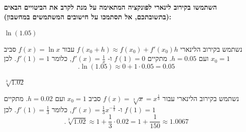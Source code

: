 \textbf{השתמשו בקירוב לינארי לפונקציה המתאימה על מנת לקרב את הביטויים הבאים (בתשובתכם,
אל תסתמכו על חישובים המשתמשים במחשבון):}
\bE{}
\item$\ln(1.05)$
\begin{solbox}
\unverified
נשתמש בקירוב הלינארי
$f(x_0+h)\approx f(x_0)+f'(x_0)h$
עבור
$f(x)=\ln x$
סביב
$x_0=1$
ועם
$h=0.05$.
מתקיים
$f(1)=0$
ו-
$f'(x)=\frac1x$,
כלומר
$f'(1)=1$.
לכן
$$.\ln(1.05)\approx 0+1\cdot 0.05=0.05$$
\end{solbox}
\item$ \sqrt[3]{1.02}$
\begin{solbox}
\unverified
נשתמש בקירוב הלינארי עבור
$f(x)=\sqrt[3]{x}=x^{\frac13}$
סביב
$x_0=1$
ועם
$h=0.02$.
מתקיים
$f(1)=1$
ו-
$f'(x)=\frac{1}{3}x^{-\frac23}$,
כלומר
$f'(1)=\frac13$.
לכן
$$.\sqrt[3]{1.02}\approx 1+\frac{1}{3}\cdot 0.02=1+\frac{1}{150}\approx 1.0067$$
\end{solbox}
\eMs
\eE
